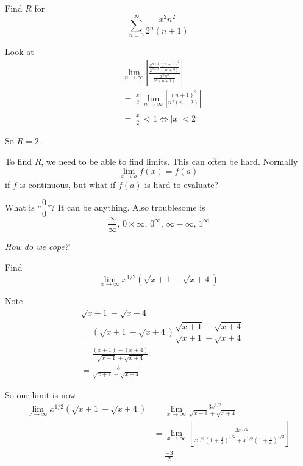 \documentclass[10pt]{scrartcl}
\begin{document}
\begin{example}Find $R$ for 
\[ \sum_{n=0}^{\infty}\frac{x^2n^2}{2^n(n+1)}\]

Look at 
\[
\begin{aligned}
  &\lim_{n \to \infty} \left|\frac{\frac{x^{n+1}}{2^{n+1}}\frac{(n+1)^2}{(n+2)}}{\frac{x^n n^2}{2^n (n+1)}}\right|\\
  &= \frac{|x|}{2} \lim_{n \to \infty}\left|\frac{(n+1)^2}{n^2(n+2)}\right|\\
  &= \frac{|x|}{2} < 1 \iff |x| < 2
\end{aligned}
\]

So $R = 2$. 
\end{example}\vspace*{5pt}

To find $R$, we need to be able to find limits. This can often be hard. Normally 
\[\lim_{x \to a} f(x) = f(a)\]
if $f$ is continuous, but what if $f(a)$ is hard to evaluate? 

What is ``$\dfrac{0}{0}$''? It can be anything. Also troublesome is \[\frac{\infty}{\infty},\,0 \times \infty,\,0^{\infty},\,\infty - \infty,\,1^{\infty}\] 

\emph{How do we cope?}\\

\begin{example} Find
\[\lim_{x \to \infty} x^{1/2}(\sqrt{x+1} - \sqrt{x+4})\]	

Note 
\[
\begin{aligned}
    &\sqrt{x+1} - \sqrt{x+4}\\
    &= (\sqrt{x+1} - \sqrt{x+4})\dfrac{\sqrt{x+1} + \sqrt{x+4}}{\sqrt{x+1} + \sqrt{x+4}}\\
    &= \frac{(x+1) - (x+4)}{\sqrt{x+1} + \sqrt{x+4}}\\
    &= \frac{-3}{\sqrt{x+1}+\sqrt{x+4}}
\end{aligned}
\]

So our limit is now:
\[
\begin{aligned}
  \lim_{x \to \infty} x^{1/2}(\sqrt{x+1} - \sqrt{x+4}) &= \lim_{x \to \infty} \frac{-3x^{1/2}}{\sqrt{x+1}+\sqrt{x+4}}\\
 &= \lim_{x \to \infty} \left[\frac{-3x^{1/2}}{x^{1/2}(1+\frac{1}{x})^{1/2} + x^{1/2}(1 + \frac{4}{x})^{1/2}}\right]\\
 &= \frac{-3}{2} 
\end{aligned}
\]
\end{example}\vspace*{5pt}
\end{document}
